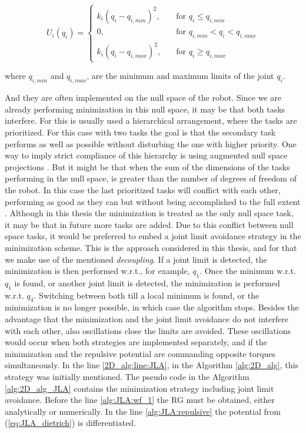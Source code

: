 \begin{equation} 
U_i(q_i) = 
\begin{cases}
k_{i} (q_{i} - q_{i,min})^{2}, &\quad\text{for \ }  q_i\le q_{i,min}\\
\text{0}, &\quad\text{for \ } q_{i,min} < q_i < q_{i,max}\\
k_{i} (q_{i} - q_{i,max})^{2}, &\quad\text{for \ }  q_i\ge q_{i,max}	
\end{cases}
\label{eq:JLA_dietrich}
\end{equation}


where $q_{i,min}$ and $q_{i,max}$, are the minimum and maximum limits of the joint $q_i$.



And they are often implemented on the null space of the robot. Since we are already performing minimization in this null space, it may be that both tasks interfere. For this is usually used a hierarchical arrangement, where the tasks are prioritized. For this case with two tasks the goal is that the secondary task performs as well as possible without disturbing the one with higher priority. One way to imply strict compliance of this hierarchy is using augmented null space projections \cite{JLA_5}. But it might be that when the sum of the dimensions of the tasks performing in the null space, is greater than the number of degrees of freedom of the robot. In this case the last prioritized tasks will conflict with each other,  performing as good as they can but without being accomplished to the full extent \cite{JLA_5}. Although in this thesis the minimization is treated as the only null space task, it may be that in future more tasks are added. 
Due to this conflict between null space tasks, it would be preferred to embed a joint limit avoidance strategy in the minimization scheme. This is the approach considered in this thesis, and for that we make use of the mentioned \textit{decoupling}. If  a joint limit is detected, the minimization is then performed w.r.t., for example, $q_1$. Once the minimum w.r.t. $q_1$ is found, or another joint limit is detected, the minimization is performed w.r.t. $q_4$. Switching between both till a local minimum is found, or the minimization is no longer possible, in which case the algorithm stops.
Besides the advantage that the minimization and the joint limit avoidance do not interfere with each other, also oscillations close the limits are avoided. These oscillations would occur when both strategies are implemented separately, and if the minimization and the repulsive potential are commanding opposite torques simultaneously. In the line \ref{2D_alg:line:JLA}, in the Algorithm \ref{alg:2D_alg}, this strategy was initially mentioned. The pseudo code in the Algorithm \ref{alg:2D_alg_JLA} contains the  minimization strategy including joint limit avoidance. Before the line \ref{alg:JLA:wf_1} the RG must be obtained, either analytically or numerically. In the line \ref{alg:JLA:repulsive} the potential from (\ref{eq:JLA_dietrich}) is differentiated.





